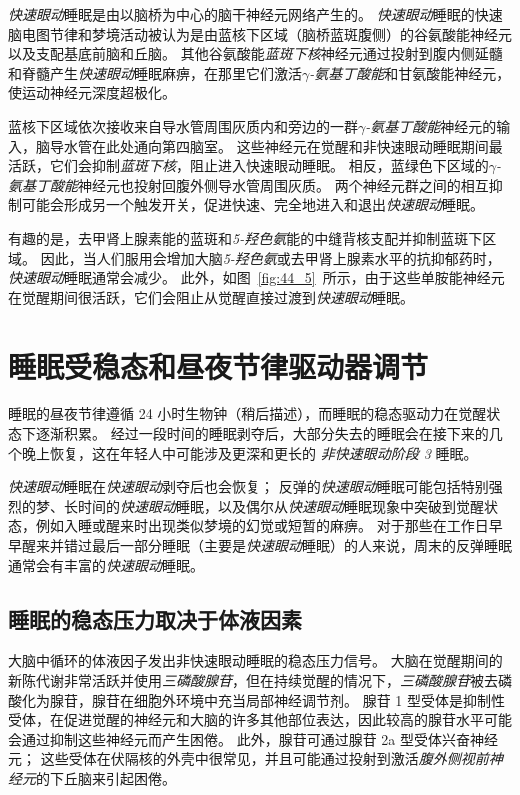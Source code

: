 \textit{快速眼动}睡眠是由以脑桥为中心的脑干神经元网络产生的。
\textit{快速眼动}睡眠的快速脑电图节律和梦境活动被认为是由蓝核下区域（脑桥蓝斑腹侧）的谷氨酸能神经元以及支配基底前脑和丘脑。
其他谷氨酸能\textit{蓝斑下核}神经元通过投射到腹内侧延髓和脊髓产生\textit{快速眼动}睡眠麻痹，在那里它们激活\textit{$\gamma$-氨基丁酸能}和甘氨酸能神经元，使运动神经元深度超极化。


蓝核下区域依次接收来自导水管周围灰质内和旁边的一群\textit{$\gamma$-氨基丁酸能}神经元的输入，脑导水管在此处通向第四脑室。
这些神经元在觉醒和非快速眼动睡眠期间最活跃，它们会抑制\textit{蓝斑下核}，阻止进入快速眼动睡眠。
相反，蓝绿色下区域的\textit{$\gamma$-氨基丁酸能}神经元也投射回腹外侧导水管周围灰质。
两个神经元群之间的相互抑制可能会形成另一个触发开关，促进快速、完全地进入和退出\textit{快速眼动}睡眠。


有趣的是，去甲肾上腺素能的蓝斑和\textit{5-羟色氨}能的中缝背核支配并抑制蓝斑下区域。
因此，当人们服用会增加大脑\textit{5-羟色氨}或去甲肾上腺素水平的抗抑郁药时，\textit{快速眼动}睡眠通常会减少。
此外，如图~\ref{fig:44_5}~所示，由于这些单胺能神经元在觉醒期间很活跃，它们会阻止从觉醒直接过渡到\textit{快速眼动}睡眠。



\section{睡眠受稳态和昼夜节律驱动器调节}

睡眠的昼夜节律遵循 24 小时生物钟（稍后描述），而睡眠的稳态驱动力在觉醒状态下逐渐积累。
经过一段时间的睡眠剥夺后，大部分失去的睡眠会在接下来的几个晚上恢复，这在年轻人中可能涉及更深和更长的 \textit{非快速眼动阶段 3} 睡眠。


\textit{快速眼动}睡眠在\textit{快速眼动}剥夺后也会恢复；
反弹的\textit{快速眼动}睡眠可能包括特别强烈的梦、长时间的\textit{快速眼动}睡眠，以及偶尔从\textit{快速眼动}睡眠现象中突破到觉醒状态，例如入睡或醒来时出现类似梦境的幻觉或短暂的麻痹。
对于那些在工作日早早醒来并错过最后一部分睡眠（主要是\textit{快速眼动}睡眠）的人来说，周末的反弹睡眠通常会有丰富的\textit{快速眼动}睡眠。



\subsection{睡眠的稳态压力取决于体液因素}

大脑中循环的体液因子发出非快速眼动睡眠的稳态压力信号。
大脑在觉醒期间的新陈代谢非常活跃并使用\textit{三磷酸腺苷}，但在持续觉醒的情况下，\textit{三磷酸腺苷}被去磷酸化为腺苷，腺苷在细胞外环境中充当局部神经调节剂。
腺苷 1 型受体是抑制性受体，在促进觉醒的神经元和大脑的许多其他部位表达，因此较高的腺苷水平可能会通过抑制这些神经元而产生困倦。
此外，腺苷可通过腺苷 2a 型受体兴奋神经元；
这些受体在伏隔核的外壳中很常见，并且可能通过投射到激活\textit{腹外侧视前神经元}的下丘脑来引起困倦。


